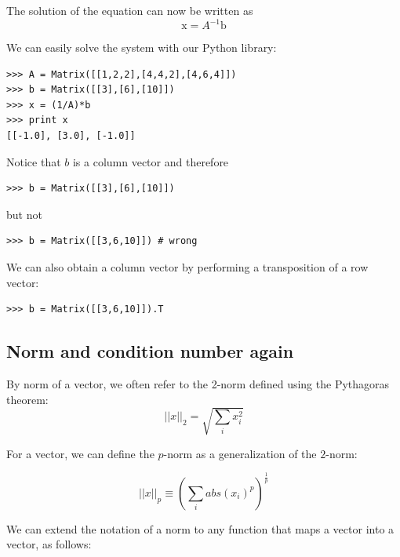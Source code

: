 \documentclass[justified,sixbynine]{tufte-book}
\def\ft{\small\tt}
\theoremstyle{plain}%
\theoremstyle{definition}
\theoremstyle{remark}
\begin{document}
\begin{fullwidth}
The solution of the equation can now be written as
\begin{equation}
\textrm{x} = A^{-1}\textrm{b}
\end{equation}

We can easily solve the system with our Python library:

\begin{lstlisting}[caption={in file: {\ft nlib.py}}]
>>> A = Matrix([[1,2,2],[4,4,2],[4,6,4]])
>>> b = Matrix([[3],[6],[10]])
>>> x = (1/A)*b
>>> print x
[[-1.0], [3.0], [-1.0]]
\end{lstlisting}

Notice that $b$ is a column vector and therefore

\begin{lstlisting}
>>> b = Matrix([[3],[6],[10]])
\end{lstlisting}

but not

\begin{lstlisting}
>>> b = Matrix([[3,6,10]]) # wrong
\end{lstlisting}

We can also obtain a column vector by performing a transposition of a row vector:

\begin{lstlisting}
>>> b = Matrix([[3,6,10]]).T
\end{lstlisting}

\goodbreak\subsection{Norm and condition number again}


By norm of a vector, we often refer to the 2-norm defined using the Pythagoras theorem:
\begin{equation}
||x||_2 = \sqrt{\sum_i x_i^2}
\end{equation}

For a vector, we can define the $p$-norm as a generalization of the $2$-norm:

\begin{equation}
||x||_p \equiv \left(\sum_i abs(x_i)^p \right)^{\frac1p}
\end{equation}

We can extend the notation of a norm to any function that maps a vector into a vector, as follows:


\end{fullwidth}
\end{document}
